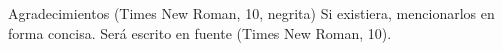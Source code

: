 \begin{thanks}
Agradecimientos (Times New Roman, 10, negrita) 
Si existiera, mencionarlos en forma concisa. Será escrito en fuente (Times New Roman, 10).
\end{thanks}
